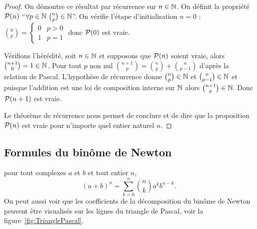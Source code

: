 \begin{proof}
  On démontre ce résultat par récurrence sur \(n\in\N\). On définit la
  propriété \(\P(n)\) ``\(\forall p \in \N \ \binom{n}{p}\in\N\)''. On vérifie
  l'étape d'initialisation \(n = 0\) : \(\binom{0}{p} =
  \begin{cases}
    0 & p>0 \\
    1 & p = 1
  \end{cases}
  \) donc \(\P(0)\) est vraie.

  Vérifions l'hérédité, soit \(n \in \N\) et supposons que \(\P(n)\) soient
  vraie, alors \(\binom{n + 1}{0} = 1\in \N\). Pour tout \(p\) non nul
  \(\binom{n + 1}{p} = \binom{n}{p}+\binom{n}{p - 1}\) d'après la relation de
  Pascal.  L'hypothèse de récurrence donne \(\binom{n}{p}\in\N\) et
  \(\binom{n}{p - 1}\in\N\) et puisque l'addition est une loi de composition
  interne sur \(\N\) alors \(\binom{n + 1}{p}\in\N\). Donc \(\P(n + 1)\) est
  vraie.

  Le théorème de récurrence nous permet de conclure et de dire que la
  proposition \(\P(n)\) est vraie pour n'importe quel entier naturel \(n\).
\end{proof}

\subsection{Formules du binôme de Newton}

\begin{prop}
  pour tout complexes \(a\) et \(b\) et tout entier \(n\),
  \begin{equation}
    (a + b)^n = \sum_{k = 0}^n \binom{n}{k}a^kb^{n - k}.
  \end{equation}
  On peut aussi voir que les coefficients de la décomposition du binôme de
  Newton peuvent être visualisés sur les lignes du triangle de Pascal, voir
  la figure~\ref{fig:TrianglePascal}.
\end{prop}

